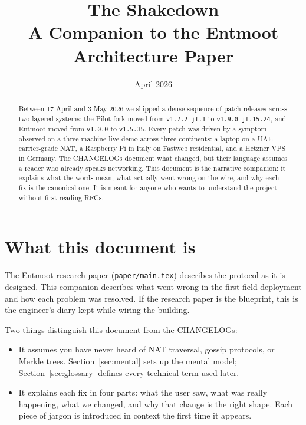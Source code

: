 \documentclass[11pt,a4paper]{article}
\title{The Shakedown\\
\large A Companion to the Entmoot Architecture Paper}
\author{}
\date{April 2026}
\begin{document}
\maketitle

\begin{abstract}
\noindent
Between 17 April and 3 May 2026 we shipped a dense sequence of
patch releases across two layered systems: the Pilot fork moved from
\texttt{v1.7.2-jf.1} to \texttt{v1.9.0-jf.15.24}, and Entmoot moved
from \texttt{v1.0.0} to \texttt{v1.5.35}. Every patch was
driven by a symptom observed on a three-machine live demo across
three continents: a laptop on a UAE carrier-grade NAT, a Raspberry Pi
in Italy on Fastweb residential, and a Hetzner VPS in Germany. The
CHANGELOGs document what changed, but their
language assumes a reader who already speaks networking. This
document is the narrative companion: it explains what the words
mean, what actually went wrong on the wire, and why each fix is
the canonical one. It is meant for anyone who wants to understand
the project without first reading RFCs.
\end{abstract}

\tableofcontents
\vspace{1em}

\section{What this document is}
\label{sec:intro}

The Entmoot research paper (\texttt{paper/main.tex}) describes the
protocol as it is designed. This companion describes what went
wrong in the first field deployment and how each problem was
resolved. If the research paper is the blueprint, this is the
engineer's diary kept while wiring the building.

Two things distinguish this document from the CHANGELOGs:

\begin{itemize}[leftmargin=1.2em]
    \item It assumes you have never heard of NAT traversal,
    gossip protocols, or Merkle trees. Section~\ref{sec:mental}
    sets up the mental model; Section~\ref{sec:glossary} defines
    every technical term used later.
    \item It explains each fix in four parts: what the user saw,
    what was really happening, what we changed, and why that
    change is the right shape. Each piece of jargon is introduced
    in context the first time it appears.
\end{itemize}
\end{document}
